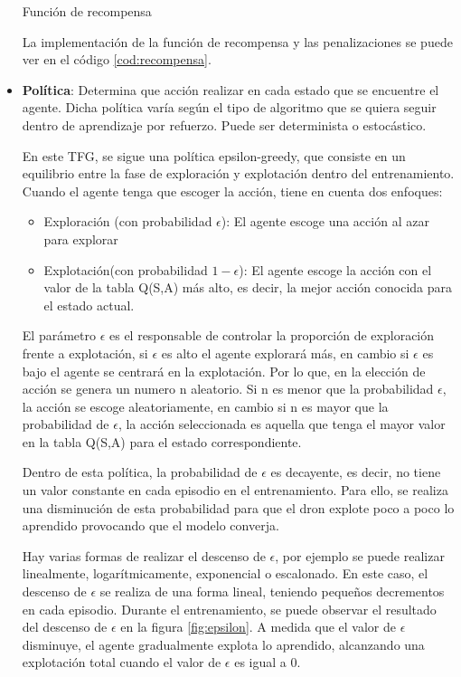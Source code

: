 \begin{itemize}
\begin{code}[H]
\begin{lstlisting}[language=Python]
      \end{lstlisting}
      \caption[Función de recompensa]{Función de recompensa}
      \label{cod:recompensa}
      \vspace{-1.5em}
      \end{code}

      La implementación de la función de recompensa y las penalizaciones se puede ver en el código \ref{cod:recompensa}.   
    \item \textbf{Política}: Determina que acción realizar en cada estado que se encuentre el agente. Dicha política varía según el tipo de algoritmo que se quiera seguir 
    dentro de aprendizaje por refuerzo. Puede ser determinista o estocástico.

    En este TFG, se sigue una política epsilon-greedy\cite{Epsilon-greedy}, que consiste en un equilibrio entre la fase de exploración y explotación dentro 
    del entrenamiento. Cuando el agente tenga que escoger la acción, tiene en cuenta dos enfoques:
 
 \begin{itemize}
   \item Exploración (con probabilidad $\epsilon$): El agente escoge una acción al azar para explorar
   \item Explotación(con probabilidad $ 1 - \epsilon$): El agente escoge la acción con el valor de la tabla Q(S,A) más alto, es decir, la mejor acción conocida para el estado actual.
 \end{itemize}
 
 El parámetro $\epsilon$ es el responsable de controlar la proporción de exploración frente a explotación, si $\epsilon$ es alto el agente explorará más, en cambio si $\epsilon$ es bajo
 el agente se centrará en la explotación. Por lo que, en la elección de acción se genera un numero n aleatorio. Si n es menor que la probabilidad $\epsilon$, la acción se escoge aleatoriamente, 
 en cambio si n es mayor que la probabilidad de $\epsilon$, la acción seleccionada es aquella que tenga el mayor valor en la tabla Q(S,A) para el estado correspondiente.
 
 Dentro de esta política, la probabilidad de $\epsilon$ es decayente, es decir, no tiene un valor constante en cada episodio en el entrenamiento. Para ello, se realiza una disminución 
 de esta probabilidad para que el dron explote poco a poco lo aprendido provocando que el modelo converja. 
 
 Hay varias formas de realizar el descenso
 de $\epsilon$, por ejemplo se puede realizar linealmente, logarítmicamente, exponencial o escalonado. En este caso, el descenso de $\epsilon$ se realiza 
 de una forma lineal, teniendo pequeños decrementos en cada episodio. Durante el entrenamiento, se puede observar el resultado del descenso de $\epsilon$ en la figura \ref{fig:epsilon}. A medida
 que el valor de $\epsilon$ disminuye, el agente gradualmente explota lo aprendido, alcanzando una explotación total cuando el valor de $\epsilon$ es igual a 0.
 

\end{itemize}
